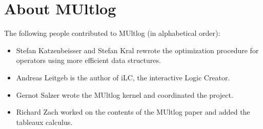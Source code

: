 \documentclass[]{article}
\providecommand{\tightlist}{%
  \setlength{\itemsep}{0pt}\setlength{\parskip}{0pt}}
\begin{document}
\hypertarget{about-multlog}{%
\section{About MUltlog}\label{about-multlog}}

The following people contributed to MUltlog (in alphabetical order):

\begin{itemize}
\tightlist
\item
  Stefan Katzenbeisser and Stefan Kral rewrote the optimization
  procedure for operators using more efficient data structures.
\item
  Andreas Leitgeb is the author of iLC, the interactive Logic Creator.
\item
  Gernot Salzer wrote the MUltlog kernel and coordinated the project.
\item
  Richard Zach worked on the contents of the MUltlog paper and added the
  tableaux calculus.
\end{itemize}
\end{document}
